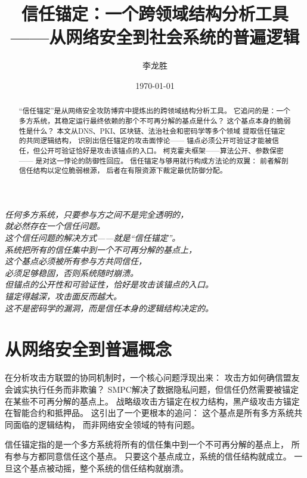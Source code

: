 \documentclass[11pt,a4paper]{article}
\title{信任锚定：一个跨领域结构分析工具\\
——从网络安全到社会系统的普遍逻辑}
\author{李龙胜}
\date{\today}
\begin{document}
\maketitle

\begin{center}
\textit{
任何多方系统，只要参与方之间不是完全透明的，\\
就必然存在一个信任问题。\\
这个信任问题的解决方式——就是“信任锚定”。\\
系统把所有的信任集中到一个不可再分解的基点上，\\
这个基点必须被所有参与方共同信任，\\
必须足够稳固，否则系统随时崩溃。\\
但锚点的公开性和可验证性，恰好是攻击该锚点的入口。\\
锚定得越深，攻击面反而越大。\\
这不是密码学的漏洞，而是信任本身的逻辑结构决定的。
}
\end{center}

\vspace{5mm}

\begin{abstract}
“信任锚定”是从网络安全攻防博弈中提炼出的跨领域结构分析工具。
它追问的是：一个多方系统，其稳定运行最终依赖的那个不可再分解的基点是什么？
这个基点本身的脆弱性是什么？
本文从DNS、PKI、区块链、法治社会和密码学等多个领域
提取信任锚定的共同逻辑结构，
识别出信任锚定的攻击面悖论——
锚点必须公开可验证才能被信任，但公开可验证恰好是攻击该锚点的入口。
柯克霍夫框架——算法公开、参数保密——
是对这一悖论的防御性回应。
信任锚定与够用就行构成方法论的双翼：
前者解剖信任结构以定位脆弱根源，
后者在有限资源下裁定最优防御分配。
\end{abstract}

\tableofcontents

\section{从网络安全到普遍概念}

在分析攻击方联盟的协同机制时，一个核心问题浮现出来：
攻击方如何确信盟友会诚实执行任务而非欺骗？
SMPC解决了数据隐私问题，但信任仍然需要被锚定在某些不可再分解的基点上。
战略级攻击方锚定在权力结构，黑产级攻击方锚定在智能合约和抵押品。
这引出了一个更根本的追问：
这个基点是所有多方系统共同面临的逻辑结构，
而非网络安全领域的特有问题。

信任锚定指的是一个多方系统将所有的信任集中到一个不可再分解的基点上，
所有参与方都同意信任这个基点。
只要这个基点成立，系统的信任结构就成立。
一旦这个基点被动摇，整个系统的信任结构就崩溃。
\end{document}
